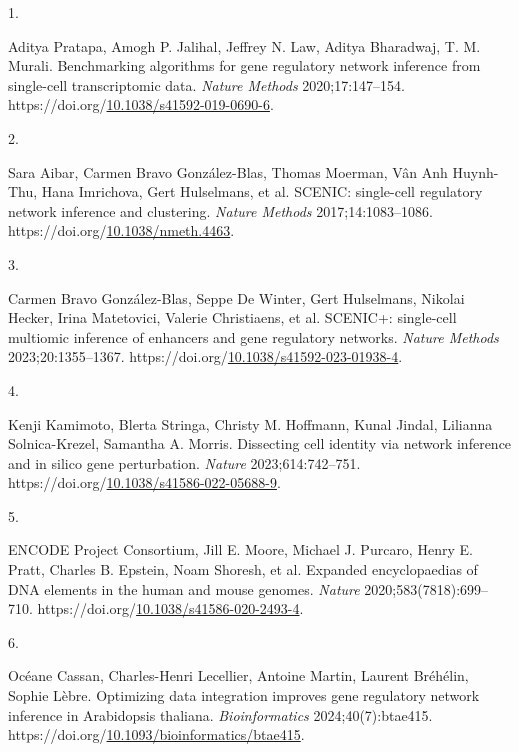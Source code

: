 \documentclass[
  11pt,
]{article}
\newlength{\cslhangindent}
\newlength{\csllabelwidth}
\newenvironment{CSLReferences}[2] %
 {\begin{list}{}{%
  \setlength{\itemindent}{0pt}
  \setlength{\leftmargin}{0pt}
  \setlength{\parsep}{0pt}
  \ifodd #1
   \setlength{\leftmargin}{\cslhangindent}
   \setlength{\itemindent}{-1\cslhangindent}
  \fi
  \setlength{\itemsep}{#2\baselineskip}}}
 {\end{list}}
\newcommand{\CSLLeftMargin}[1]{\parbox[t]{\csllabelwidth}{\strut#1\strut}}
\newcommand{\CSLRightInline}[1]{\parbox[t]{\linewidth - \csllabelwidth}{\strut#1\strut}}
\begin{document}
\label{refs}
\begin{CSLReferences}{0}{1}
\CSLLeftMargin{1. }%
\CSLRightInline{Aditya Pratapa, Amogh P. Jalihal, Jeffrey N. Law, Aditya
Bharadwaj, T. M. Murali. Benchmarking algorithms for gene regulatory
network inference from single-cell transcriptomic data. \emph{Nature
Methods} 2020;17:147--154.
https://doi.org/\href{https://doi.org/10.1038/s41592-019-0690-6}{10.1038/s41592-019-0690-6}.}

\CSLLeftMargin{2. }%
\CSLRightInline{Sara Aibar, Carmen Bravo González-Blas, Thomas Moerman,
Vân Anh Huynh-Thu, Hana Imrichova, Gert Hulselmans, et al. SCENIC:
single-cell regulatory network inference and clustering. \emph{Nature
Methods} 2017;14:1083--1086.
https://doi.org/\href{https://doi.org/10.1038/nmeth.4463}{10.1038/nmeth.4463}.}

\CSLLeftMargin{3. }%
\CSLRightInline{Carmen Bravo González-Blas, Seppe De Winter, Gert
Hulselmans, Nikolai Hecker, Irina Matetovici, Valerie Christiaens, et
al. SCENIC+: single-cell multiomic inference of enhancers and gene
regulatory networks. \emph{Nature Methods} 2023;20:1355--1367.
https://doi.org/\href{https://doi.org/10.1038/s41592-023-01938-4}{10.1038/s41592-023-01938-4}.}

\CSLLeftMargin{4. }%
\CSLRightInline{Kenji Kamimoto, Blerta Stringa, Christy M. Hoffmann,
Kunal Jindal, Lilianna Solnica-Krezel, Samantha A. Morris. Dissecting
cell identity via network inference and in silico gene perturbation.
\emph{Nature} 2023;614:742--751.
https://doi.org/\href{https://doi.org/10.1038/s41586-022-05688-9}{10.1038/s41586-022-05688-9}.}

\CSLLeftMargin{5. }%
\CSLRightInline{ENCODE Project Consortium, Jill E. Moore, Michael J.
Purcaro, Henry E. Pratt, Charles B. Epstein, Noam Shoresh, et al.
Expanded encyclopaedias of DNA elements in the human and mouse genomes.
\emph{Nature} 2020;583(7818):699--710.
https://doi.org/\href{https://doi.org/10.1038/s41586-020-2493-4}{10.1038/s41586-020-2493-4}.}

\CSLLeftMargin{6. }%
\CSLRightInline{Océane Cassan, Charles-Henri Lecellier, Antoine Martin,
Laurent Bréhélin, Sophie Lèbre. Optimizing data integration improves
gene regulatory network inference in Arabidopsis thaliana.
\emph{Bioinformatics} 2024;40(7):btae415.
https://doi.org/\href{https://doi.org/10.1093/bioinformatics/btae415}{10.1093/bioinformatics/btae415}.}


\end{CSLReferences}
\end{document}
